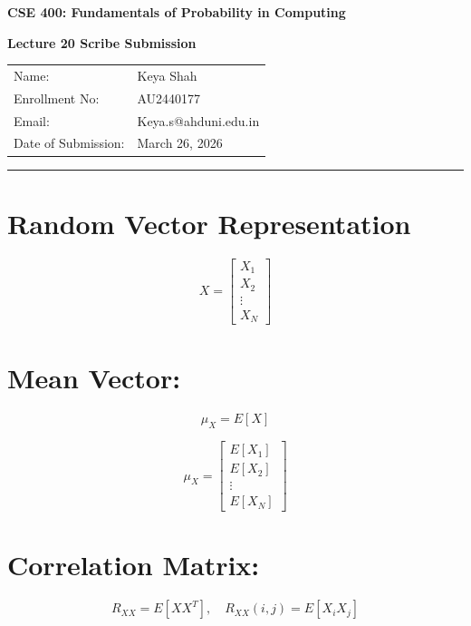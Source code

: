 \documentclass[11pt]{article}
\begin{document}
\begin{center}

{\Large \textbf{CSE 400: Fundamentals of Probability in Computing}}

\vspace{0.5cm}

{\Large \textbf{Lecture 20 Scribe Submission}}

\vspace{0.2cm}

{\large
\begin{tabular}{l l}
Name: & Keya Shah \\
Enrollment No: & AU2440177 \\
Email: & Keya.s@ahduni.edu.in \\
Date of Submission: & March 26, 2026 \\
\end{tabular}
}
\hrule

\end{center}

\section{Random Vector Representation}

\[
X =
\begin{bmatrix}
X_1 \\
X_2 \\
\vdots \\
X_N
\end{bmatrix}
\]

\section{Mean Vector:}

\[
\mu_X = E[X]
\]

\[
\mu_X =
\begin{bmatrix}
E[X_1] \\
E[X_2] \\
\vdots \\
E[X_N]
\end{bmatrix}
\]

\section{Correlation Matrix:}

\[
R_{XX} = E[XX^T], \quad R_{XX}(i,j) = E[X_i X_j]
\]
\end{document}
